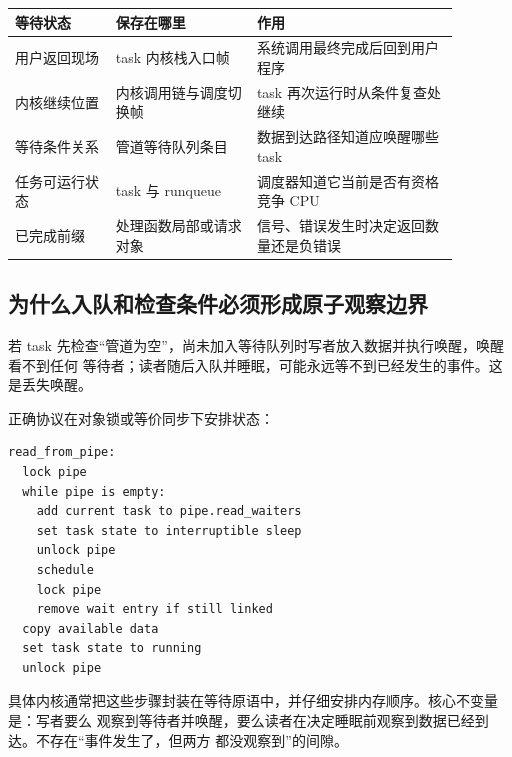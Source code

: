 \begin{longtable}{|L{0.20\linewidth}|L{0.28\linewidth}|L{0.40\linewidth}|}
\hline
等待状态 & 保存在哪里 & 作用 \\ \hline
用户返回现场 & task 内核栈入口帧 & 系统调用最终完成后回到用户程序 \\ \hline
内核继续位置 & 内核调用链与调度切换帧 & task 再次运行时从条件复查处继续 \\ \hline
等待条件关系 & 管道等待队列条目 & 数据到达路径知道应唤醒哪些 task \\ \hline
任务可运行状态 & task 与 runqueue & 调度器知道它当前是否有资格竞争 CPU \\ \hline
已完成前缀 & 处理函数局部或请求对象 & 信号、错误发生时决定返回数量还是负错误 \\ \hline
\end{longtable}

\subsection{为什么入队和检查条件必须形成原子观察边界}

若 task 先检查“管道为空”，尚未加入等待队列时写者放入数据并执行唤醒，唤醒看不到任何
等待者；读者随后入队并睡眠，可能永远等不到已经发生的事件。这是丢失唤醒。

正确协议在对象锁或等价同步下安排状态：

\begin{lstlisting}
read_from_pipe:
  lock pipe
  while pipe is empty:
    add current task to pipe.read_waiters
    set task state to interruptible sleep
    unlock pipe
    schedule
    lock pipe
    remove wait entry if still linked
  copy available data
  set task state to running
  unlock pipe
\end{lstlisting}

具体内核通常把这些步骤封装在等待原语中，并仔细安排内存顺序。核心不变量是：写者要么
观察到等待者并唤醒，要么读者在决定睡眠前观察到数据已经到达。不存在“事件发生了，但两方
都没观察到”的间隙。

